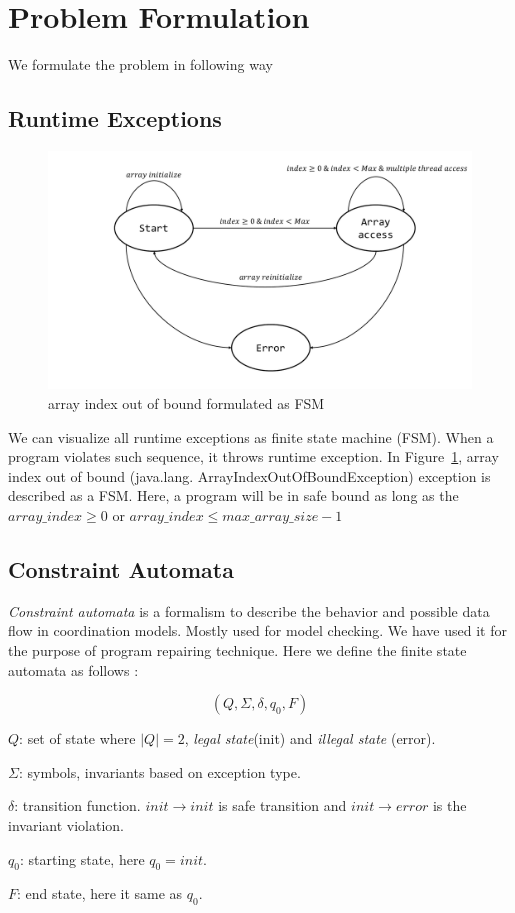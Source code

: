 
\section{Problem Formulation}
\label{sec:form}

We formulate the problem in following way

\subsection{Runtime Exceptions}
\label{subsec:excep}

\begin{figure}[htb]
\centering
\includegraphics[scale = .25]{images/ArrayIndex.pdf}
\caption{array index out of bound formulated as FSM}
\label{fig:array}
\end{figure}


We can visualize all runtime exceptions as finite state machine (FSM). When a
program violates such sequence, it throws runtime exception. 
In Figure~\ref{fig:array}, array index out of bound (java.lang.
ArrayIndexOutOfBoundException) exception is described as a FSM. 
Here, a program will be in safe bound as long as the $array\_index \geq 0$ or
$array\_index \leq max\_array\_size - 1$

\subsection{Constraint Automata}
\label{subsec:constraintAutomata}

\emph{Constraint automata} is a formalism to describe the behavior and possible
data flow in coordination models. 
Mostly used for model checking. We have used it for the purpose of program
repairing technique. Here we define the finite state automata as follows :

$$(Q, \Sigma, \delta, q_0, F)$$
\begin{mybullet}
 \item $Q$: set of state where $|Q| = 2$, \emph{legal state}(init) and
\emph{illegal state} (error).
 \item $\Sigma$: symbols, invariants based on exception type.
 \item $\delta$: transition function. $init \rightarrow init$ is safe
transition and $init \rightarrow error$ is the invariant violation.
 \item $q_0$: starting state, here $q_0 = init$.
 \item $F$: end state, here it same as $q_0$.
\end{mybullet}

